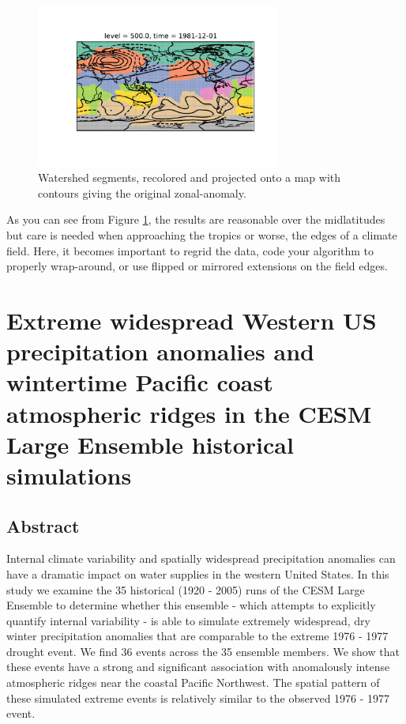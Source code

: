 \documentclass[final, double]{ua-thesis}
\begin{document}
\begin{figure}[h]
 \centerline{\includegraphics[width=19pc]{p2figures/fig_example_out6.pdf}}
  \caption{Watershed segments, recolored and projected onto a map with contours giving the original zonal-anomaly.}\label{fig_example_out6}
\end{figure}

As you can see from Figure \ref{fig_example_out6}, the results are reasonable over the midlatitudes but care is needed when approaching the tropics or worse, the edges of a climate field. Here, it becomes important to regrid the data, code your algorithm to properly wrap-around, or use flipped or mirrored extensions on the field edges.

\chapter{Extreme widespread Western US precipitation anomalies and wintertime Pacific coast atmospheric ridges in the CESM Large Ensemble historical simulations}

\section{Abstract}
Internal climate variability and spatially widespread precipitation anomalies can have a dramatic impact on water supplies in the western United States. In this study we examine the 35 historical (1920 - 2005) runs of the CESM Large Ensemble to determine whether this ensemble - which attempts to explicitly quantify internal variability -  is able to simulate extremely widespread, dry winter precipitation anomalies that are comparable to the extreme 1976 - 1977 drought event. We find 36 events across the 35 ensemble members. We show that these events have a strong and significant association with anomalously intense atmospheric ridges near the coastal Pacific Northwest. The spatial pattern of these simulated extreme events is relatively similar to the observed 1976 - 1977 event.
\end{document}
